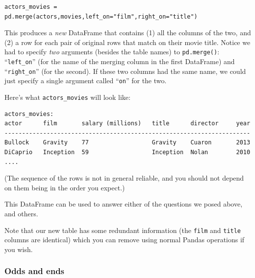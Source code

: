 \documentclass[12pt]{article}
\begin{document}
\begin{Verbatim}[fontsize=\small,samepage=true,frame=none]
actors_movies = pd.merge(actors,movies,left_on="film",right_on="title")
\end{Verbatim}

This produces a \textit{new} DataFrame that contains (1) all the columns of
the two, and (2) a row for each pair of original rows that match on their
movie title. Notice we had to specify \textit{two} arguments (besides the
table names) to \texttt{pd.merge()}: ``\texttt{left\_on}'' (for the name of the
merging column in the first DataFrame) and ``\texttt{right\_on}'' (for the
second). If these two columns had the same name, we could just specify a
single argument called ``\texttt{on}'' for the two.

\vspace{.2in}
Here's what \texttt{actors\_movies} will look like:
\begin{Verbatim}[fontsize=\small,samepage=true,frame=none]
                            actors_movies:
actor      film       salary (millions)   title      director     year
----------------------------------------------------------------------
Bullock    Gravity    77                  Gravity    Cuaron       2013
DiCaprio   Inception  59                  Inception  Nolan        2010
....
\end{Verbatim}
(The sequence of the rows is not in general reliable, and you should not
depend on them being in the order you expect.)

This DataFrame can be used to answer either of the questions we posed above,
and others.

Note that our new table has some redundant information (the \texttt{film} and
\texttt{title} columns are identical) which you can remove using normal Pandas
operations if you wish.

\subsubsection{Odds and ends}
\end{document}
